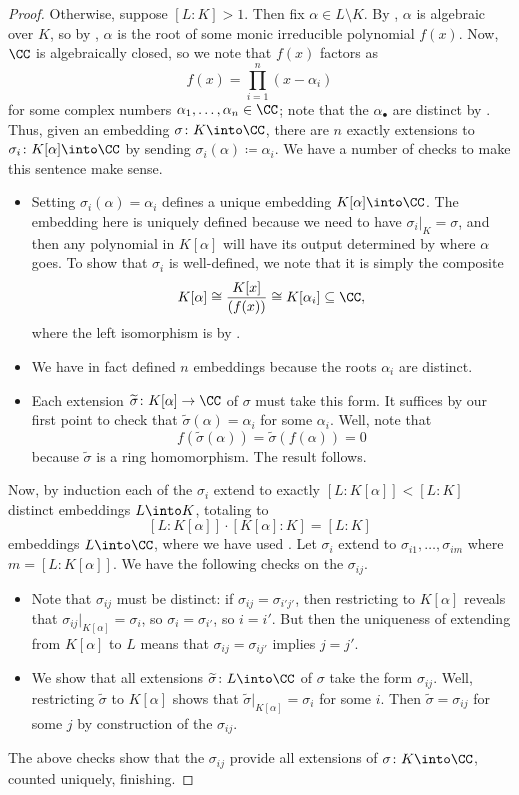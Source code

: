 \documentclass[../notes.tex]{subfiles}
\begin{document}
\begin{proof}
	Otherwise, suppose $[L:K]>1$. Then fix $\alpha\in L\setminus K$. By , $\alpha$ is algebraic over $K$, so by , $\alpha$ is the root of some monic irreducible polynomial $f(x)$. Now, $\CC$ is algebraically closed, so we note that $f(x)$ factors as
	\[f(x)=\prod_{i=1}^n(x-\alpha_i)\]
	for some complex numbers $\alpha_1,\ldots,\alpha_n\in\CC$; note that the $\alpha_\bullet$ are distinct by . Thus, given an embedding $\sigma\colon K\into\CC$, there are $n$ exactly extensions to $\sigma_i\colon K[\alpha]\into\CC$ by sending $\sigma_i(\alpha)\coloneqq\alpha_i$. We have a number of checks to make this sentence make sense.
	\begin{itemize}
		\item Setting $\sigma_i(\alpha)=\alpha_i$ defines a unique embedding $K[\alpha]\into\CC$. The embedding here is uniquely defined because we need to have $\sigma_i|_K=\sigma$, and then any polynomial in $K[\alpha]$ will have its output determined by where $\alpha$ goes. To show that $\sigma_i$ is well-defined, we note that it is simply the composite
		\[K[\alpha]\cong\frac{K[x]}{(f(x))}\cong K[\alpha_i]\subseteq\CC,\]
		where the left isomorphism is by .
		\item We have in fact defined $n$ embeddings because the roots $\alpha_i$ are distinct.
		\item Each extension $\widetilde\sigma\colon K[\alpha]\to\CC$ of $\sigma$ must take this form. It suffices by our first point to check that $\widetilde\sigma(\alpha)=\alpha_i$ for some $\alpha_i$. Well, note that
		\[f(\widetilde\sigma(\alpha))=\widetilde\sigma(f(\alpha))=0\]
		because $\widetilde\sigma$ is a ring homomorphism. The result follows.
	\end{itemize}
	Now, by induction each of the $\sigma_i$ extend to exactly $[L:K[\alpha]]<[L:K]$ distinct embeddings $L\into K$, totaling to
	\[[L:K[\alpha]]\cdot[K[\alpha]:K]=[L:K]\]
	embeddings $L\into\CC$, where we have used . Let $\sigma_i$ extend to $\sigma_{i1},\ldots,\sigma_{im}$ where $m=[L:K[\alpha]]$. We have the following checks on the $\sigma_{ij}$.
	\begin{itemize}
		\item Note that $\sigma_{ij}$ must be distinct: if $\sigma_{ij}=\sigma_{i'j'}$, then restricting to $K[\alpha]$ reveals that $\sigma_{ij}|_{K[\alpha]}=\sigma_i$, so $\sigma_i=\sigma_{i'}$, so $i=i'$. But then the uniqueness of extending from $K[\alpha]$ to $L$ means that $\sigma_{ij}=\sigma_{ij'}$ implies $j=j'$.
		\item We show that all extensions $\widetilde\sigma\colon L\into\CC$ of $\sigma$ take the form $\sigma_{ij}$. Well, restricting $\widetilde\sigma$ to $K[\alpha]$ shows that $\widetilde\sigma|_{K[\alpha]}=\sigma_i$ for some $i$. Then $\widetilde\sigma=\sigma_{ij}$ for some $j$ by construction of the $\sigma_{ij}$.
	\end{itemize}
	The above checks show that the $\sigma_{ij}$ provide all extensions of $\sigma\colon K\into\CC$, counted uniquely, finishing.
\end{proof}
\end{document}
